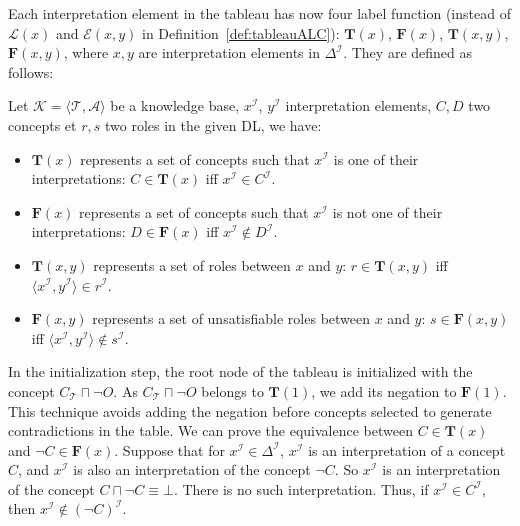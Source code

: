 \documentclass{article}
\begin{document}
Each interpretation element in the tableau has now four label function (instead of $\mathcal{L}(x)$ and $\mathcal{E}(x,y)$ in Definition~\ref{def:tableauALC}):
$\mathbf{T}(x)$, $\mathbf{F}(x)$, $\mathbf{T}(x,y)$, $\mathbf{F}(x,y)$,
where  $x,y$ are interpretation elements in $\Delta^\mathcal{I}$.
They are defined as follows:

 Let $\mathcal{K}=\langle \mathcal{T},\mathcal{A}\rangle$ be a knowledge base,  $x^{\mathcal{I}}$, $y^{\mathcal{I}}$ interpretation elements, $C,D$  two concepts et $r, s$ two roles in the given DL,
 we have:
 \begin{itemize}
 \item   $\mathbf{T}(x)$ represents a set of concepts such that $x^\mathcal{I}$ is one of their interpretations:
   $C\in \mathbf{T}(x)$ iff $x^\mathcal{I} \in C^\mathcal{I}$.
 \item   $\mathbf{F}(x)$ represents a set of concepts such that $x^\mathcal{I}$ is not one of their interpretations:
  $D\in \mathbf{F}(x)$ iff $x^\mathcal{I} \notin D^\mathcal{I}$.
 \item   $\mathbf{T}(x,y)$ represents a set of roles between $x$ and $y$:
  $r\in \mathbf{T}(x,y)$ iff $\langle x^\mathcal{I}, y^\mathcal{I} \rangle \in r^\mathcal{I}$.
 \item   $\mathbf{F}(x,y)$ represents a set of unsatisfiable roles between $x$ and $y$:
  $s\in \mathbf{F}(x,y)$ iff $\langle x^\mathcal{I}, y^\mathcal{I} \rangle \notin s^\mathcal{I}$.
 \end{itemize}
 
 In the initialization step, the root node of the tableau is initialized with the concept $C_\mathcal{T}\sqcap \neg O$.
 As $C_\mathcal{T}\sqcap \neg O$ belongs to $\mathbf{T}(1)$, we add its negation to $\mathbf{F}(1)$.
 This technique avoids adding the negation before concepts selected to generate contradictions in the table.
 We can prove the equivalence between $ C\in \mathbf{T}(x) $ and $\neg C \in \mathbf {F}(x)$. Suppose that for $x^\mathcal{I} \in \Delta^\mathcal{I}$, $x^\mathcal{I}$ is an interpretation of a concept $C$,
and $x^\mathcal{I}$ is also an interpretation of the concept $\neg C$. So $x^\mathcal{I}$ is an interpretation of the concept $C\sqcap\neg C\equiv \bot$. There is no such interpretation.
Thus, if $x^\mathcal{I}\in C^\mathcal{I}$, then $x^\mathcal{I} \notin(\neg C)^\mathcal{I}$.
 
\end{document}
